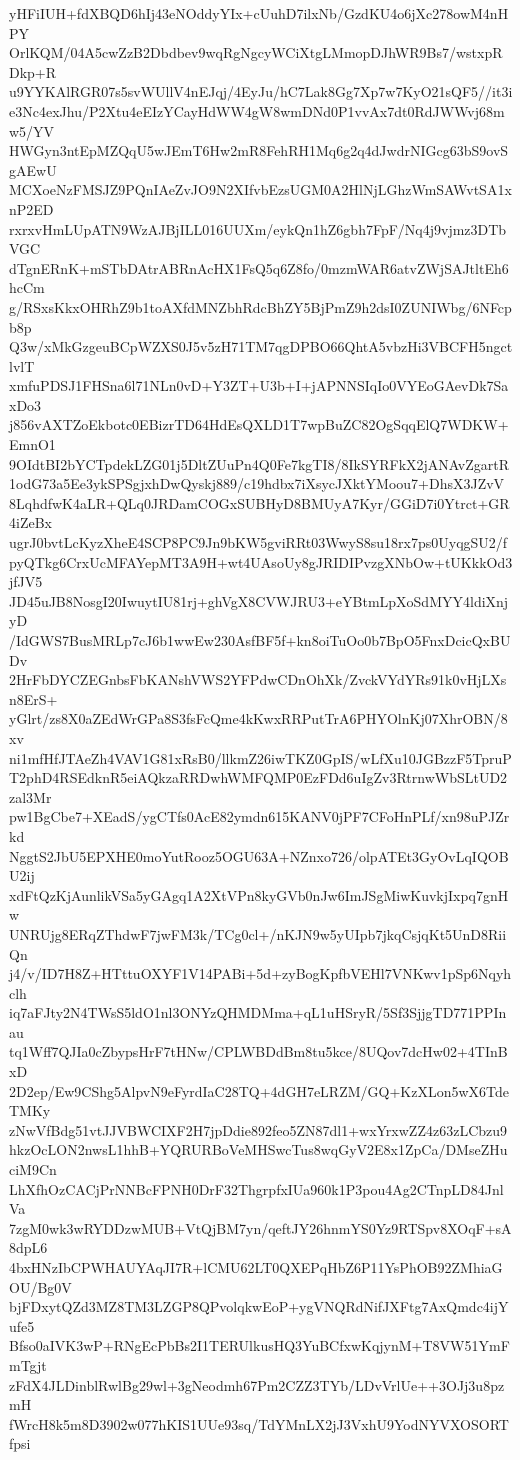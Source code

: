 yHFiIUH+fdXBQD6hIj43eNOddyYIx+cUuhD7ilxNb/GzdKU4o6jXc278owM4nHPY
OrlKQM/04A5cwZzB2Dbdbev9wqRgNgcyWCiXtgLMmopDJhWR9Bs7/wstxpRDkp+R
u9YYKAlRGR07s5svWUllV4nEJqj/4EyJu/hC7Lak8Gg7Xp7w7KyO21sQF5//it3i
e3Nc4exJhu/P2Xtu4eEIzYCayHdWW4gW8wmDNd0P1vvAx7dt0RdJWWvj68mw5/YV
HWGyn3ntEpMZQqU5wJEmT6Hw2mR8FehRH1Mq6g2q4dJwdrNIGcg63bS9ovSgAEwU
MCXoeNzFMSJZ9PQnIAeZvJO9N2XIfvbEzsUGM0A2HlNjLGhzWmSAWvtSA1xnP2ED
rxrxvHmLUpATN9WzAJBjILL016UUXm/eykQn1hZ6gbh7FpF/Nq4j9vjmz3DTbVGC
dTgnERnK+mSTbDAtrABRnAcHX1FsQ5q6Z8fo/0mzmWAR6atvZWjSAJtltEh6hcCm
g/RSxsKkxOHRhZ9b1toAXfdMNZbhRdcBhZY5BjPmZ9h2dsI0ZUNIWbg/6NFcpb8p
Q3w/xMkGzgeuBCpWZXS0J5v5zH71TM7qgDPBO66QhtA5vbzHi3VBCFH5ngctlvlT
xmfuPDSJ1FHSna6l71NLn0vD+Y3ZT+U3b+I+jAPNNSIqIo0VYEoGAevDk7SaxDo3
j856vAXTZoEkbotc0EBizrTD64HdEsQXLD1T7wpBuZC82OgSqqElQ7WDKW+EmnO1
9OIdtBI2bYCTpdekLZG01j5DltZUuPn4Q0Fe7kgTI8/8IkSYRFkX2jANAvZgartR
1odG73a5Ee3ykSPSgjxhDwQyskj889/c19hdbx7iXsycJXktYMoou7+DhsX3JZvV
8LqhdfwK4aLR+QLq0JRDamCOGxSUBHyD8BMUyA7Kyr/GGiD7i0Ytrct+GR4iZeBx
ugrJ0bvtLcKyzXheE4SCP8PC9Jn9bKW5gviRRt03WwyS8su18rx7ps0UyqgSU2/f
pyQTkg6CrxUcMFAYepMT3A9H+wt4UAsoUy8gJRIDIPvzgXNbOw+tUKkkOd3jfJV5
JD45uJB8NosgI20IwuytIU81rj+ghVgX8CVWJRU3+eYBtmLpXoSdMYY4ldiXnjyD
/IdGWS7BusMRLp7cJ6b1wwEw230AsfBF5f+kn8oiTuOo0b7BpO5FnxDcicQxBUDv
2HrFbDYCZEGnbsFbKANshVWS2YFPdwCDnOhXk/ZvckVYdYRs91k0vHjLXsn8ErS+
yGlrt/zs8X0aZEdWrGPa8S3fsFcQme4kKwxRRPutTrA6PHYOlnKj07XhrOBN/8xv
ni1mfHfJTAeZh4VAV1G81xRsB0/llkmZ26iwTKZ0GpIS/wLfXu10JGBzzF5TpruP
T2phD4RSEdknR5eiAQkzaRRDwhWMFQMP0EzFDd6uIgZv3RtrnwWbSLtUD2zal3Mr
pw1BgCbe7+XEadS/ygCTfs0AcE82ymdn615KANV0jPF7CFoHnPLf/xn98uPJZrkd
NggtS2JbU5EPXHE0moYutRooz5OGU63A+NZnxo726/olpATEt3GyOvLqIQOBU2ij
xdFtQzKjAunlikVSa5yGAgq1A2XtVPn8kyGVb0nJw6ImJSgMiwKuvkjIxpq7gnHw
UNRUjg8ERqZThdwF7jwFM3k/TCg0cl+/nKJN9w5yUIpb7jkqCsjqKt5UnD8RiiQn
j4/v/ID7H8Z+HTttuOXYF1V14PABi+5d+zyBogKpfbVEHl7VNKwv1pSp6Nqyhclh
iq7aFJty2N4TWsS5ldO1nl3ONYzQHMDMma+qL1uHSryR/5Sf3SjjgTD771PPInau
tq1Wff7QJIa0cZbypsHrF7tHNw/CPLWBDdBm8tu5kce/8UQov7dcHw02+4TInBxD
2D2ep/Ew9CShg5AlpvN9eFyrdIaC28TQ+4dGH7eLRZM/GQ+KzXLon5wX6TdeTMKy
zNwVfBdg51vtJJVBWCIXF2H7jpDdie892feo5ZN87dl1+wxYrxwZZ4z63zLCbzu9
hkzOcLON2nwsL1hhB+YQRURBoVeMHSwcTus8wqGyV2E8x1ZpCa/DMseZHuciM9Cn
LhXfhOzCACjPrNNBcFPNH0DrF32ThgrpfxIUa960k1P3pou4Ag2CTnpLD84JnlVa
7zgM0wk3wRYDDzwMUB+VtQjBM7yn/qeftJY26hnmYS0Yz9RTSpv8XOqF+sA8dpL6
4bxHNzIbCPWHAUYAqJI7R+lCMU62LT0QXEPqHbZ6P11YsPhOB92ZMhiaGOU/Bg0V
bjFDxytQZd3MZ8TM3LZGP8QPvolqkwEoP+ygVNQRdNifJXFtg7AxQmdc4ijYufe5
Bfso0aIVK3wP+RNgEcPbBs2I1TERUlkusHQ3YuBCfxwKqjynM+T8VW51YmFmTgjt
zFdX4JLDinblRwlBg29wl+3gNeodmh67Pm2CZZ3TYb/LDvVrlUe++3OJj3u8pzmH
fWrcH8k5m8D3902w077hKIS1UUe93sq/TdYMnLX2jJ3VxhU9YodNYVXOSORTfpsi
